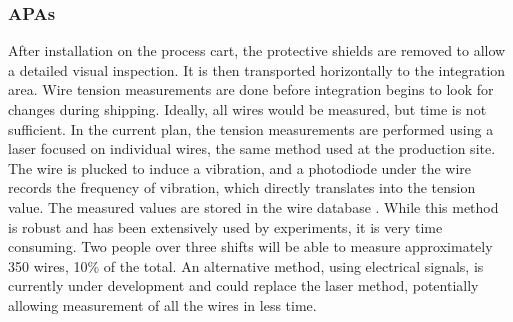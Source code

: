 \subsubsection{APAs}
After installation on the process cart, the protective shields are removed to allow a detailed visual inspection. It is then transported horizontally to the integration area. Wire tension measurements are done  before integration begins to look for changes during shipping. Ideally, all wires would be measured, but time is not sufficient. 
In the current plan, the tension measurements are performed using a laser focused on individual wires, the same method used at the production site. The wire is plucked to induce a vibration, and a photodiode under the wire records the frequency of vibration, which directly translates into the tension value. The measured values are stored in the wire  database . While this method is robust and has been extensively used by  experiments, it is very time consuming. Two people over three shifts will be able to measure approximately 350 wires, 10\% of the total.  An alternative method, using electrical signals, is currently under development and could replace the laser method, potentially allowing measurement of all the wires in less time.

